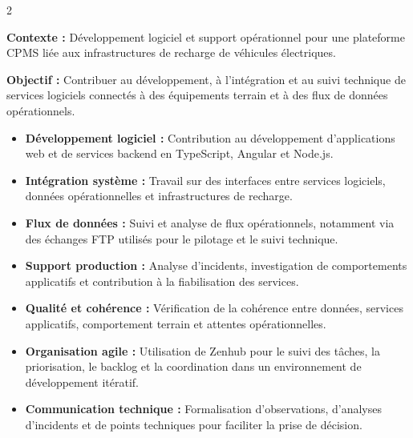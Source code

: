 \documentclass[8pt,a4paper,ragged2e,withhyper]{altacv}
\begin{document}



\makecvheader
\vspace{-0.3cm}


\begin{paracol}{2}



\textbf{Contexte :} Développement logiciel et support opérationnel pour une plateforme CPMS liée aux infrastructures de recharge de véhicules électriques.

\textbf{Objectif :} Contribuer au développement, à l'intégration et au suivi technique de services logiciels connectés à des équipements terrain et à des flux de données opérationnels.

\begin{itemize}
  \item \textbf{Développement logiciel :} Contribution au développement d'applications web et de services backend en TypeScript, Angular et Node.js.
  \item \textbf{Intégration système :} Travail sur des interfaces entre services logiciels, données opérationnelles et infrastructures de recharge.
  \item \textbf{Flux de données :} Suivi et analyse de flux opérationnels, notamment via des échanges FTP utilisés pour le pilotage et le suivi technique.
  \item \textbf{Support production :} Analyse d'incidents, investigation de comportements applicatifs et contribution à la fiabilisation des services.
  \item \textbf{Qualité et cohérence :} Vérification de la cohérence entre données, services applicatifs, comportement terrain et attentes opérationnelles.
  \item \textbf{Organisation agile :} Utilisation de Zenhub pour le suivi des tâches, la priorisation, le backlog et la coordination dans un environnement de développement itératif.
  \item \textbf{Communication technique :} Formalisation d'observations, d'analyses d'incidents et de points techniques pour faciliter la prise de décision.
\end{itemize}


\end{paracol}
\end{document}
